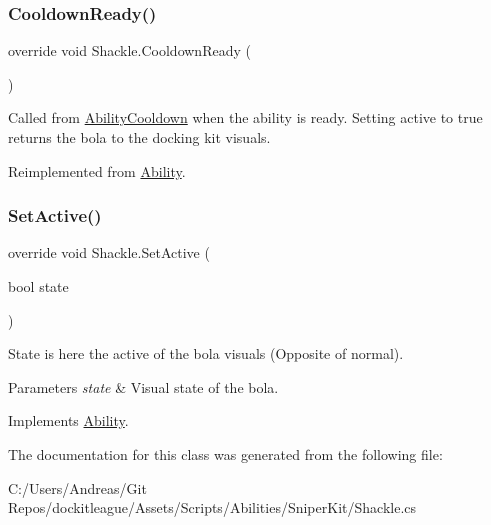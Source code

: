 \subsubsection{\texorpdfstring{Cooldown\+Ready()}{CooldownReady()}}
{\footnotesize\ttfamily override void Shackle.\+Cooldown\+Ready (\begin{DoxyParamCaption}{ }\end{DoxyParamCaption})\hspace{0.3cm}{\ttfamily [virtual]}}



Called from \hyperlink{class_ability_cooldown}{Ability\+Cooldown} when the ability is ready. Setting active to true returns the bola to the docking kit visuals. 



Reimplemented from \hyperlink{class_ability_af5abb620807086a1752b17b276c76a2e}{Ability}.

\hypertarget{class_shackle_ac8715fddd58c3d0dd0b22cd31820ace4}{}\label{class_shackle_ac8715fddd58c3d0dd0b22cd31820ace4} 
\subsubsection{\texorpdfstring{Set\+Active()}{SetActive()}}
{\footnotesize\ttfamily override void Shackle.\+Set\+Active (\begin{DoxyParamCaption}\item[{bool}]{state }\end{DoxyParamCaption})\hspace{0.3cm}{\ttfamily [virtual]}}



State is here the active of the bola visuals (Opposite of normal). 


\begin{DoxyParams}{Parameters}
{\em state} & Visual state of the bola.\\
\hline
\end{DoxyParams}


Implements \hyperlink{class_ability_a10f7f3c2b63eeef6e352aee48d246384}{Ability}.



The documentation for this class was generated from the following file\+:\begin{DoxyCompactItemize}
\item 
C\+:/\+Users/\+Andreas/\+Git Repos/dockitleague/\+Assets/\+Scripts/\+Abilities/\+Sniper\+Kit/Shackle.\+cs\end{DoxyCompactItemize}
